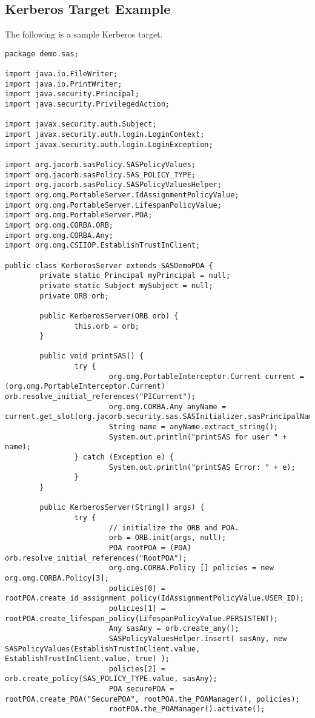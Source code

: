 \subsection{Kerberos Target Example}

The following is a sample Kerberos target.

\begin{scriptsize}
\begin{verbatim}
package demo.sas;

import java.io.FileWriter;
import java.io.PrintWriter;
import java.security.Principal;
import java.security.PrivilegedAction;

import javax.security.auth.Subject;
import javax.security.auth.login.LoginContext;
import javax.security.auth.login.LoginException;

import org.jacorb.sasPolicy.SASPolicyValues;
import org.jacorb.sasPolicy.SAS_POLICY_TYPE;
import org.jacorb.sasPolicy.SASPolicyValuesHelper;
import org.omg.PortableServer.IdAssignmentPolicyValue;
import org.omg.PortableServer.LifespanPolicyValue;
import org.omg.PortableServer.POA;
import org.omg.CORBA.ORB;
import org.omg.CORBA.Any;
import org.omg.CSIIOP.EstablishTrustInClient;

public class KerberosServer extends SASDemoPOA {
        private static Principal myPrincipal = null;
        private static Subject mySubject = null;
        private ORB orb;

        public KerberosServer(ORB orb) {
                this.orb = orb;
        }

        public void printSAS() {
                try {
                        org.omg.PortableInterceptor.Current current = (org.omg.PortableInterceptor.Current) orb.resolve_initial_references("PICurrent");
                        org.omg.CORBA.Any anyName = current.get_slot(org.jacorb.security.sas.SASInitializer.sasPrincipalNamePIC);
                        String name = anyName.extract_string();
                        System.out.println("printSAS for user " + name);
                } catch (Exception e) {
                        System.out.println("printSAS Error: " + e);
                }
        }

        public KerberosServer(String[] args) {
                try {
                        // initialize the ORB and POA.
                        orb = ORB.init(args, null);
                        POA rootPOA = (POA) orb.resolve_initial_references("RootPOA");
                        org.omg.CORBA.Policy [] policies = new org.omg.CORBA.Policy[3];
                        policies[0] = rootPOA.create_id_assignment_policy(IdAssignmentPolicyValue.USER_ID);
                        policies[1] = rootPOA.create_lifespan_policy(LifespanPolicyValue.PERSISTENT);
                        Any sasAny = orb.create_any();
                        SASPolicyValuesHelper.insert( sasAny, new SASPolicyValues(EstablishTrustInClient.value, EstablishTrustInClient.value, true) );
                        policies[2] = orb.create_policy(SAS_POLICY_TYPE.value, sasAny);
                        POA securePOA = rootPOA.create_POA("SecurePOA", rootPOA.the_POAManager(), policies);
                        rootPOA.the_POAManager().activate();


\end{verbatim}
\end{scriptsize}
